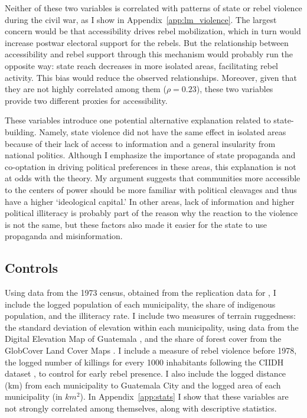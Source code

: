 \documentclass[12pt, notitlepage]{article}
\begin{document}
Neither of these two variables is correlated with patterns of state or rebel violence during the civil war, as I show in Appendix~\ref{app:lm_violence}.
The largest concern would be that accessibility drives rebel mobilization, which in turn would increase postwar electoral support for the rebels.
But the relationship between accessibility and rebel support through this mechanism would probably run the opposite way: state reach decreases in more isolated areas, facilitating rebel activity.
This bias would reduce the observed relationships.
Moreover, given that they are not highly correlated among them ($\rho = 0.23$), these two variables provide two different proxies for accessibility.

These variables introduce one potential alternative explanation related to state-building.
Namely, state violence did not have the same effect in isolated areas because of their lack of access to information and a general insularity from national politics.
Although I emphasize the importance of state propaganda and co-optation in driving political preferences in these areas, this explanation is not at odds with the theory.
My argument suggests that communities more accessible to the centers of power should be more familiar with political cleavages and thus have a higher `ideological capital.'
In other areas, lack of information and higher political illiteracy is probably part of the reason why the reaction to the violence is not the same, but these factors also made it easier for the state to use propaganda and misinformation.

\subsection*{Controls}

Using data from the 1973 census, obtained from the replication data for \citet{Sullivan:2012aa}, I include the logged population of each municipality, the share of indigenous population, and the illiteracy rate.
I include two measures of terrain ruggedness: the standard deviation of elevation within each municipality, using data from the Digital Elevation Map of Guatemala \citep{Mapzen:2018aa}, and the share of forest cover from the GlobCover Land Cover Maps \citep{Arino:2012aa}.
I include a measure of rebel violence before 1978, the logged number of killings for every 1000 inhabitants following the CIIDH dataset \citep{Ball:1999aa}, to control for early rebel presence.
I also include the logged distance (km) from each municipality to Guatemala City and the logged area of each municipality (in $km^2$).
In Appendix~\ref{app:stats} I show that these variables are not strongly correlated among themselves, along with descriptive statistics.
\end{document}
